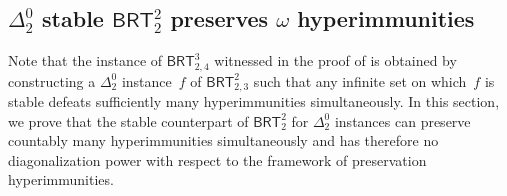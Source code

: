 \documentclass{article}
\newcommand{\BRT}[0]{\mathsf{BRT}}
\newcommand{\NN}[0]{\mathbb{N}}
\newtheorem{theorem}{Theorem}
\numberwithin{theorem}{section}
\begin{document}
\subsection{$\Delta^0_2$ stable $\BRT^2_2$ preserves $\omega$ hyperimmunities}

Note that the instance of $\BRT^3_{2,4}$ witnessed in the proof of  is obtained by constructing a $\Delta^0_2$ instance~$f$ of $\BRT^2_{2,3}$ such that any infinite set on which~$f$ is stable defeats sufficiently many hyperimmunities simultaneously. In this section, we prove that the stable counterpart of $\BRT^2_2$ for $\Delta^0_2$ instances can preserve countably many hyperimmunities simultaneously and has therefore no diagonalization power with respect to the framework of preservation hyperimmunities.

\end{document}
